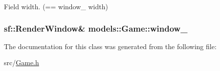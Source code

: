 \-Field width. (== window\-\_\- width) 

\hypertarget{classmodels_1_1Game_a6060ca52bfe25a1c0c6f9938ed7392c1}{
\subsubsection[{window\-\_\-}]{\setlength{\rightskip}{0pt plus 5cm}sf\-::\-Render\-Window\& {\bf models\-::\-Game\-::window\-\_\-}}}\label{d1/d10/classmodels_1_1Game_a6060ca52bfe25a1c0c6f9938ed7392c1}


\-The documentation for this class was generated from the following file\-:\begin{DoxyCompactItemize}
\item 
src/\hyperlink{Game_8h}{\-Game.\-h}\end{DoxyCompactItemize}
